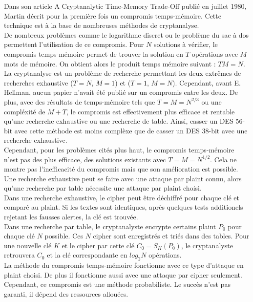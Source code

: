 
	Dans son article \og{}A Cryptanalytic Time-Memory Trade-Off\fg{}\cite{ehellman} publié en juillet 1980, Martin  décrit pour la première fois un compromis temps-mémoire. Cette technique est à la base de nombreuses méthodes de cryptanalyse.\\

	De nombreux problèmes comme le logarithme discret ou le problème du sac à dos permettent l'utilisation de ce compromis. Pour $N$ solutions à vérifier, le compromis temps-mémoire permet de trouver la solution en $T$ opérations avec $M$ mots de mémoire. On obtient alors le produit temps mémoire suivant : $TM = N$.\\

	La cryptanalyse est un problème de recherche permettant les deux extrêmes de recherches exhaustive ($T=N$, $M=1$) et ($T=1$, $M=N$). Cependant, avant E. Hellman\cite{ehellman}, aucun papier n'avait été publié sur un compromis entre les deux. De plus, avec des résultats de temps-mémoire tels que $T = M = N^{2/3}$ ou une compléxité de $M + T$, le compromis est effectivement plus efficace et rentable qu'une recherche exhaustive ou une recherche de table. Ainsi, casser un DES 56-bit avec cette méthode est moins complèxe que de casser un DES 38-bit avec une recherche exhaustive.\\

	Cependant, pour les problèmes cités plus haut, le compromis temps-mémoire n'est pas des plus efficace, des solutions existants avec $T = M = N^{1/2}$. Cela ne montre pas l'inefficacité du compromis mais que son amélioration est possible.\\

	Une recherche exhaustive peut se faire avec une attaque par \gls{plaint} connu, alors qu'une recherche par table nécessite une attaque par \gls{plaint} choisi.\\

	Dans une recherche exhaustive, le \gls{cipher} peut être déchiffré pour chaque clé et comparé au \gls{plaint}. Si les textes sont identiques, après quelques tests additionels rejetant les fausses alertes, la clé est trouvée.\\

	Dans une recherche par table, le cryptanalyste encrypte certains \gls{plaint} $P_0$ pour chaque clé $N$ possible. Ces $N$ \gls{cipher} sont enregistrés et triés dans des tables. Pour une nouvelle clé $K$ et le \gls{cipher} par cette clé $C_0 = S_K(P_0)$, le cryptanalyste retrouvera $C_0$ et la clé correspondante en $log_2 N$ opérations.\\

	La méthode du compromis temps-mémoire fonctionne avec ce type d'attaque en \gls{plaint} choisi. De plus il fonctionne aussi avec une attaque par \gls{cipher} seulement. Cependant, ce compromis est une méthode probabiliste. Le succès n'est pas garanti, il dépend des ressources allouées.

\endinput{}
